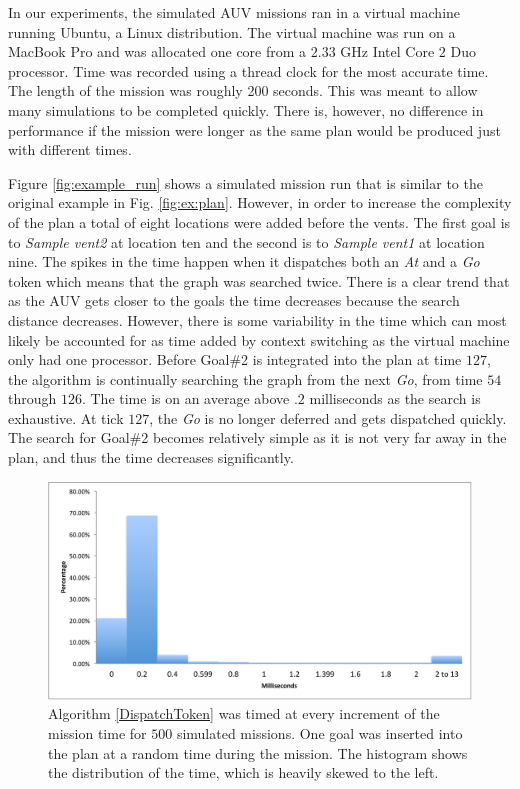 In our experiments, the simulated AUV missions ran in a virtual
machine running Ubuntu, a Linux distribution. The virtual machine was
run on a MacBook Pro and was allocated one core from
a $2.33$ GHz Intel Core $2$ Duo processor. Time was
recorded using a thread clock for the most accurate time. The length of
the mission was roughly 200 seconds. This was meant to allow many
simulations to be completed quickly. There is, however, no difference in 
performance if the mission were longer as the same plan would be produced
just with different times.

Figure \ref{fig:example_run} shows a simulated mission run that
is similar to the original example in Fig. \ref{fig:ex:plan}.
However, in order to increase the complexity of the plan a
total of eight locations were added before the vents. The first goal is to
{\em Sample vent2} at location ten and the second is to {\em Sample
  vent1} at location nine. The spikes in the time happen when it
dispatches both an {\em At} and a {\em Go} token which means that the graph
was searched twice. There is a clear trend that as the AUV gets
closer to the goals the time decreases because the search distance
decreases.  However, there is some variability in the time which can
most likely be accounted for as time added by context switching as the
virtual machine only had one processor. Before Goal\#2 is integrated
into the plan at time $127$, the algorithm is continually searching the
graph from the next {\em Go}, from time $54$ through $126$. The time is on an average above $.2$
milliseconds as the search is exhaustive. At tick $127$, the {\em Go} is no longer deferred and gets
dispatched quickly. The search for Goal\#2 becomes relatively simple as it is
not very far away in the plan, and thus the time decreases
significantly.

\begin{figure}[!htbp]
  \centering
  \includegraphics[width=\columnwidth]{figs/HistogramAlg1}
  \caption{\small Algorithm \ref{DispatchToken} was 
  timed at every increment of the mission time for $500$ 
  simulated missions. One goal was inserted into the plan 
  at a random time during the mission. The histogram shows 
  the distribution of the time, which is heavily skewed to the left.}
  \label{fig:histogram}
\end{figure}

